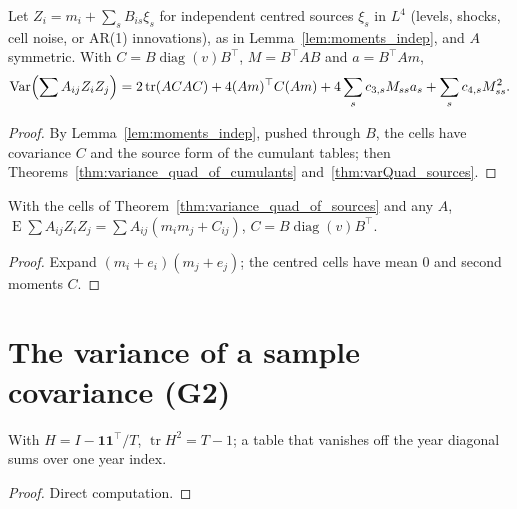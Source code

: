 \begin{theorem}\label{thm:variance_quad_of_sources}
  \leanok
  Let $Z_i = m_i + \sum_s B_{is}\xi_s$ for independent centred sources $\xi_s$ in $L^4$ (levels,
  shocks, cell noise, or AR(1) innovations), as in Lemma~\ref{lem:moments_indep}, and $A$
  symmetric. With $C = B\operatorname{diag}(v)B^\top$, $M = B^\top AB$ and $a = B^\top Am$,
  \[ \operatorname{Var}\Bigl(\sum A_{ij}Z_iZ_j\Bigr) = 2\operatorname{tr}(ACAC) + 4(Am)^\top C(Am)
     + 4\sum_s c_{3,s}M_{ss}a_s + \sum_s c_{4,s}M_{ss}^2. \]
\end{theorem}
\begin{proof}
  \leanok
  By Lemma~\ref{lem:moments_indep}, pushed through $B$, the cells have covariance $C$ and the source
  form of the cumulant tables; then Theorems~\ref{thm:variance_quad_of_cumulants}
  and~\ref{thm:varQuad_sources}.
\end{proof}

\begin{theorem}\label{thm:integral_quad_of_sources}
  \leanok
  With the cells of Theorem~\ref{thm:variance_quad_of_sources} and any $A$,
  $\operatorname{E}\sum A_{ij}Z_iZ_j = \sum A_{ij}(m_im_j + C_{ij})$, $C = B\operatorname{diag}(v)B^\top$.
\end{theorem}
\begin{proof}
  \leanok
  Expand $(m_i + e_i)(m_j + e_j)$; the centred cells have mean $0$ and second moments $C$.
\end{proof}

\section{The variance of a sample covariance (G2)}

\begin{lemma}\label{lem:sampleCov_algebra}
  \leanok
  With $H = I - \mathbf 1\mathbf 1^\top/T$, $\operatorname{tr}H^2 = T - 1$; a table that vanishes
  off the year diagonal sums over one year index.
\end{lemma}
\begin{proof}
  \leanok
  Direct computation.
\end{proof}



